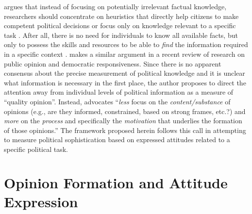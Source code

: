 \documentclass[12pt]{article}
\begin{document}
\citet{lupia2006elitism} argues that instead of focusing on potentially irrelevant factual knowledge, researchers should concentrate on heuristics that directly help citizens to make competent political decisions or focus only on knowledge relevant to a specific task \citep[see also][]{lupia1994shortcuts,lupia2015uninformed}. After all, there is no need for individuals to know all available facts, but only to possess the skills and resources to be able to \textit{find} the information required in a specific context \citep{prior2008money}. \citet{druckman2014pathologies} makes a similar argument in a recent review of research on public opinion and democratic responsiveness. Since there is no apparent consensus about the precise measurement of political knowledge and it is unclear what information is necessary in the first place, the author proposes to direct the attention away from individual levels of political information as a measure of ``quality opinion''. Instead, \citet[478, emphasis in the original]{druckman2014pathologies} advocates ``\textit{less} focus on the \textit{content/substance} of opinions (e.g., are they informed, constrained, based on strong frames, etc.?) and \textit{more} on the \textit{process} and specifically the \textit{motivation} that underlies the formation of those opinions.'' The framework proposed herein follows this call in attempting to measure political sophistication based on expressed attitudes related to a specific political task.


\section*{Opinion Formation and Attitude Expression}

\end{document}
